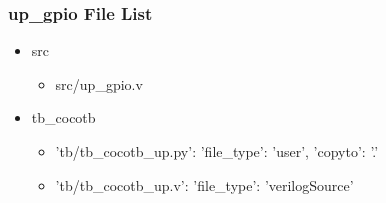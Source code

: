 \subsubsection{up\_gpio File List}
\begin{itemize}
\item src
	\begin{itemize}
	\item src/up\_gpio.v
	\end{itemize}
\item tb\_cocotb
	\begin{itemize}
	\item {'tb/tb\_cocotb\_up.py': {'file\_type': 'user', 'copyto': '.'}}
	\item {'tb/tb\_cocotb\_up.v': {'file\_type': 'verilogSource'}}
	\end{itemize}
\end{itemize}
